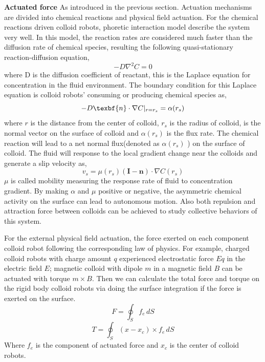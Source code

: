 \textbf{Actuated force} As introduced in the previous section. Actuation mechanisms are divided into chemical reactions and physical field actuation. For the chemical reactions driven colloid robots, phoretic interaction  model describe the system very well. \cite{golestanian2007,najafi2004simple,golestanian2005propulsion,golestanian2019phoretic} In this model, the reaction rates are considered much faster than the diffusion rate of chemical species, resulting the following   
quasi-stationary reaction-diffusion equation,
\begin{equation}
    -D\nabla^2 C=0
\end{equation}
where D is the diffusion coefficient of reactant, this is the Laplace equation for concentration in the fluid environment. The boundary condition for this Laplace equation is  colloid robots' consuming or producing chemical species as,
\begin{equation}
    -D \texbf{n}\cdot \nabla C|_{r=r_s}=\alpha(r_s)
\end{equation}
where $r$ is the distance from the center of colloid, $r_s$ is the radius of colloid,  is the normal vector on the surface of colloid and $\alpha(r_s)$ is the flux rate. The chemical reaction will lead to a net normal flux(denoted as $\alpha(r_s)$ ) on the surface of colloid. The fluid will response to the local gradient change near the colloids and generate a slip velocity as,
\begin{equation}
    v_s=\mu(r_s)(\textbf{I}-\textbf{n})\cdot \nabla C(r_s)
\end{equation}
$\mu$ is called mobility measuring the response rate of fluid to concentration gradient. By making $\alpha$ and $\mu$ positive or negative, the asymmetric chemical activity on the surface can lead to autonomous motion.  Also both repulsion and attraction force between colloids can be achieved to study collective behaviors of this system. \cite{michelin2015autophoretic}

For the external physical field actuation, the force exerted on each component colloid robot following the corresponding law of physics. For example, charged colloid robots with charge amount $q$ experienced electrostatic force $Eq$ in the electric field $E$; magnetic colloid with dipole $m$ in a magnetic field $B$ can be actuated with torque $m\times B$.
Then we can calculate the total force and torque on the rigid body colloid robots via doing the surface integration if the force is exerted on the surface.
\begin{equation}
    F=\oint_S f_e \,dS
\end{equation}
\begin{equation}
    T=\oint_S (x-x_c)\times f_e \,dS
\end{equation}
Where $f_e$  is the component of actuated force and $x_c$ is the center of colloid robots.

